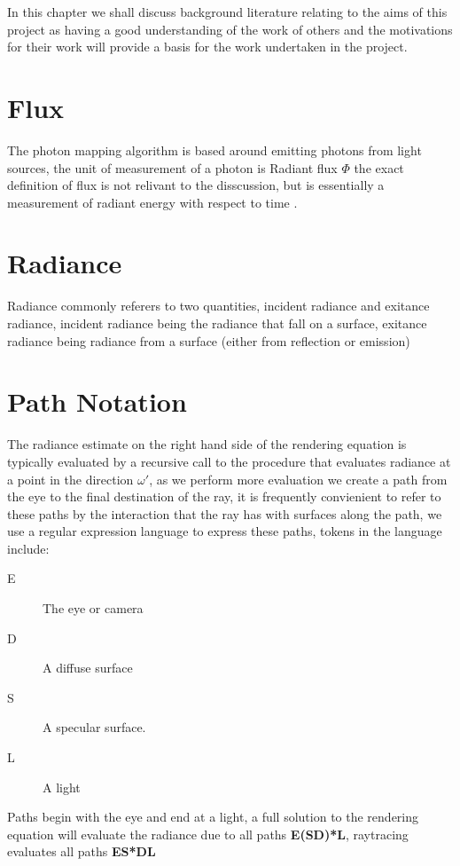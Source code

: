 \label{chap:lit}
In this chapter we shall discuss background literature relating to the aims of this project as
having a good understanding of the work of others and the motivations for their work will provide
a basis for the work undertaken in the project.

\section{Flux}
The photon mapping algorithm is based around emitting photons from light sources, the unit of measurement of a photon is
Radiant flux $\Phi$ the exact definition of flux is not relivant to the disscussion, but is essentially a measurement
of radiant energy with respect to time \cite{JensenBook}.

\section{Radiance}
Radiance commonly referers to two quantities, incident radiance and exitance radiance, incident radiance being the radiance
that fall on a surface, exitance radiance being radiance from a surface (either from reflection or emission)




\section{Path Notation}
The radiance estimate on the right hand side of the rendering equation is typically evaluated by a recursive call to the
procedure that evaluates radiance at a point in the direction $\omega'$, as we perform more evaluation we create a path
from the eye to the final destination of the ray, it is frequently convienient to refer to these paths by the interaction
that the ray has with surfaces along the path, we use a regular expression language to express these paths, tokens in the
language include:
\begin{description}
\item[E] The eye or camera
\item[D] A diffuse surface
\item[S] A specular surface.
\item[L] A light
\end{description}

Paths begin with the eye and end at a light, a full solution to the rendering equation will evaluate the radiance due
to all paths \textbf{E(S\textbar D)*L}, raytracing evaluates all paths \textbf{ES*DL}









